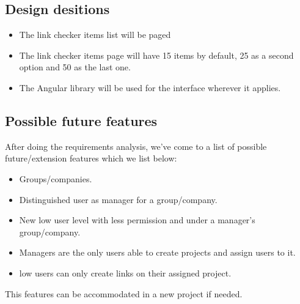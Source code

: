 \subsection{Design desitions}
\begin{itemize}
	\item The link checker items list will be paged
	\item The link checker items page will have 15 items by default, 25 as a second option and 50 as the last one.
	\item The Angular library will be used for the interface wherever it applies.
\end{itemize}

\subsection{Possible future features}
After doing the requirements analysis, we've come to a list of possible future/extension features which we list below:
\begin{itemize}
	\item Groups/companies.
	\item Distinguished user as manager for a group/company.
	\item New low user level with less permission and under a manager's group/company.
	\item Managers are the only users able to create projects and assign users to it.
	\item low users can only create links on their assigned project.
\end{itemize}

This features can be accommodated in a new project if needed.